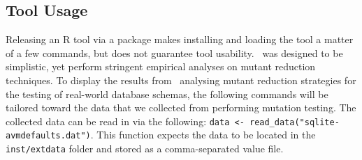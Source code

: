 \subsection{Tool Usage}





Releasing an R tool via a package makes installing and loading the tool a matter of a few commands,
but does not guarantee tool usability. \mr~was designed to be simplistic, yet perform stringent
empirical analyses on mutant reduction techniques. To display the results from \mr~analysing mutant
reduction strategies for the testing of real-world database schemas, the following commands will be
tailored toward the data that we collected from performing mutation testing. The collected data can
be read in via the following: {\small\texttt{data <- read\_data("sqlite-avmdefaults.dat")}}. This
function expects the data to be located in the \texttt{inst/extdata} folder and stored as a
comma-separated value file.






